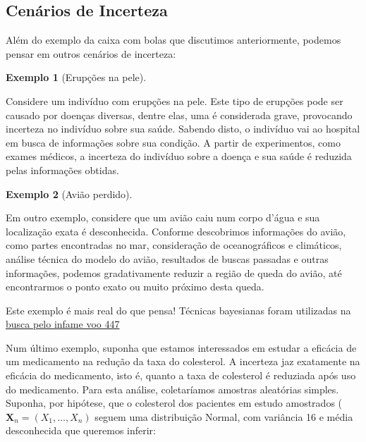 \documentclass[
  portuguese,
  letterpaper,
  DIV=11,
  numbers=noendperiod]{scrreport}
\theoremstyle{definition}
\theoremstyle{definition}
\newtheorem{example}{Exemplo}[chapter]
\theoremstyle{plain}
\theoremstyle{remark}
\begin{document}
\subsection{Cenários de Incerteza}\label{cenuxe1rios-de-incerteza}

Além do exemplo da caixa com bolas que discutimos anteriormente, podemos
pensar em outros cenários de incerteza:

\begin{example}[Erupções na
pele]\protect\hypertarget{exm-pele}{}\label{exm-pele}

Considere um indivíduo com erupções na pele. Este tipo de erupções pode
ser causado por doenças diversas, dentre elas, uma é considerada grave,
provocando incerteza no indivíduo sobre sua saúde. Sabendo disto, o
indivíduo vai ao hospital em busca de informações sobre sua condição. A
partir de experimentos, como exames médicos, a incerteza do indivíduo
sobre a doença e sua saúde é reduzida pelas informações obtidas.

\end{example}

\begin{example}[Avião
perdido]\protect\hypertarget{exm-aviao}{}\label{exm-aviao}

Em outro exemplo, considere que um avião caiu num corpo d'água e sua
localização exata é desconhecida. Conforme descobrimos informações do
avião, como partes encontradas no mar, consideração de oceanográficos e
climáticos, análise técnica do modelo do avião, resultados de buscas
passadas e outras informações, podemos gradativamente reduzir a região
de queda do avião, até encontrarmos o ponto exato ou muito próximo desta
queda.

Este exemplo é mais real do que pensa! Técnicas bayesianas foram
utilizadas na
\href{https://www.technologyreview.com/2014/05/27/13283/how-statisticians-found-air-france-flight-447-two-years-after-it-crashed-into-atlantic/}{busca
pelo infame voo 447}

\end{example}

Num último exemplo, suponha que estamos interessados em estudar a
eficácia de um medicamento na redução da taxa do colesterol. A incerteza
jaz exatamente na eficácia do medicamento, isto é, quanto a taxa de
colesterol é reduziada após uso do medicamento. Para esta análise,
coletaríamos amostras aleatórias simples. Suponha, por hipótese, que o
colesterol dos pacientes em estudo amostrados
(\(\boldsymbol{X}_n = (X_1, \dots, X_n)\) seguem uma distribuição
Normal, com variância 16 e média desconhecida que queremos inferir:
\end{document}
